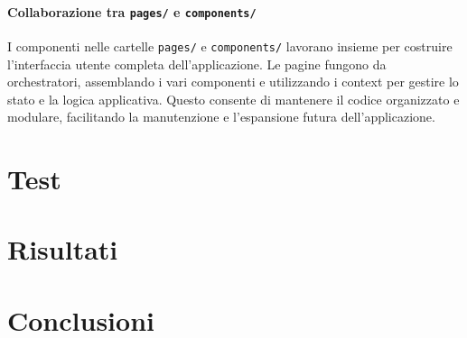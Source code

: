 \documentclass[twoside]{supsistudent}
\begin{document}
\subsubsection{Collaborazione tra \texttt{pages/} e \texttt{components/}}
I componenti nelle cartelle \texttt{pages/} e \texttt{components/} lavorano insieme per costruire l'interfaccia utente completa dell'applicazione. Le pagine fungono da orchestratori, assemblando i vari componenti e utilizzando i context per gestire lo stato e la logica applicativa. Questo consente di mantenere il codice organizzato e modulare, facilitando la manutenzione e l'espansione futura dell'applicazione.


\chapter{Test}
\chapter{Risultati}
\chapter{Conclusioni}


\cite{1705631}


\end{document}
